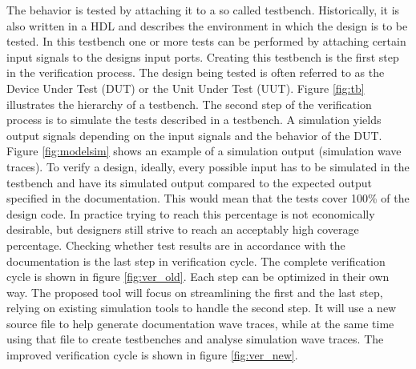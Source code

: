 \nline
The behavior is tested by attaching it to a so called testbench.  Historically, it is also written in a HDL and describes the environment in which the design is to be tested. In this testbench one or more tests can be performed by attaching certain input signals to the designs input ports. Creating this testbench is the first step in the verification process. The design being tested is often referred to as the Device Under Test (DUT) or the Unit Under Test (UUT). Figure \ref{fig:tb} illustrates the hierarchy of a testbench.
\nline
The second step of the verification process is to simulate the tests described in a testbench. A simulation yields output signals depending on the input signals and the behavior of the DUT. Figure \ref{fig:modelsim} shows an example of a simulation output (simulation wave traces).\newpage
{}\noindent
To verify a design, ideally,  every possible input has to be simulated in the testbench and have its simulated output compared to the expected output specified in the documentation. This would mean that the tests cover 100\% of the design code. In practice trying to reach this percentage is not economically desirable, but designers still strive to reach an acceptably high coverage percentage. Checking whether test results are in accordance with the documentation is the last step in verification cycle.
\npar
The complete verification cycle is shown in figure \ref{fig:ver_old}.\nline
{}\nline
Each step can be optimized in their own way. The proposed tool will focus on streamlining the first and the last step, relying on existing simulation tools to handle the second step. It will use a new source file to help generate documentation wave traces, while at the same time using that file to create testbenches and analyse simulation wave traces. The improved verification cycle is shown in figure \ref{fig:ver_new}.\nline
{}\nline
